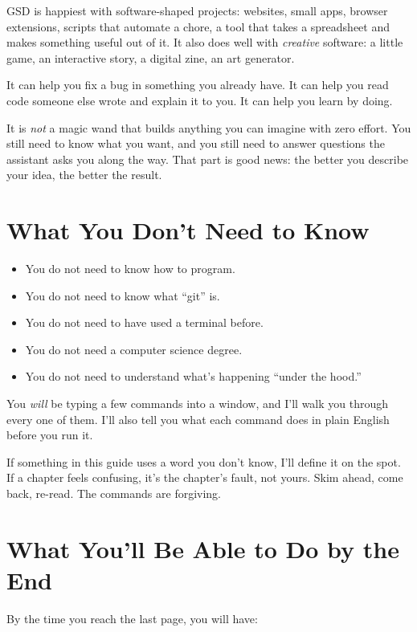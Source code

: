 \documentclass[11pt,letterpaper,openany]{book}
\begin{document}
GSD is happiest with software-shaped projects: websites, small apps,
browser extensions, scripts that automate a chore, a tool that takes a
spreadsheet and makes something useful out of it. It also does well with
\emph{creative} software: a little game, an interactive story, a digital
zine, an art generator.

It can help you fix a bug in something you already have. It can help you
read code someone else wrote and explain it to you. It can help you learn
by doing.

It is \emph{not} a magic wand that builds anything you can imagine with
zero effort. You still need to know what you want, and you still need to
answer questions the assistant asks you along the way. That part is good
news: the better you describe your idea, the better the result.

\section{What You Don't Need to Know}

\begin{itemize}
  \item You do not need to know how to program.
  \item You do not need to know what ``git'' is.
  \item You do not need to have used a terminal before.
  \item You do not need a computer science degree.
  \item You do not need to understand what's happening ``under the hood.''
\end{itemize}

You \emph{will} be typing a few commands into a window, and I'll walk you
through every one of them. I'll also tell you what each command does in plain
English before you run it.

\begin{gsdtip}
If something in this guide uses a word you don't know, I'll define it on the
spot. If a chapter feels confusing, it's the chapter's fault, not yours.
Skim ahead, come back, re-read. The commands are forgiving.
\end{gsdtip}

\section{What You'll Be Able to Do by the End}

By the time you reach the last page, you will have:
\end{document}
